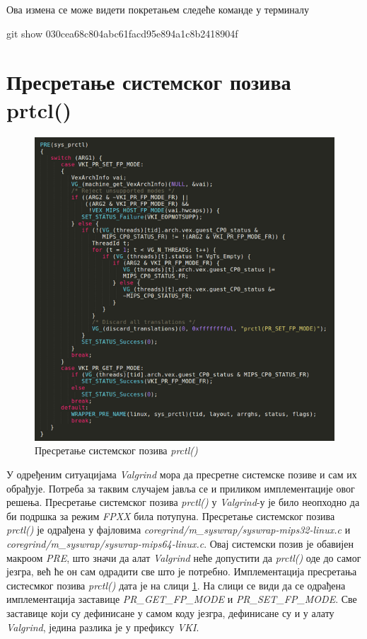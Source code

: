 \documentclass[12pt,oneside]{memoir}
\begin{document}
Ова измена се може видети покретањем следеће команде у терминалу

\begin{center}
git show 030cea68c804abc61facd95e894a1c8b2418904f
\end{center}

\section{Пресретање системског позива prtcl()}

\begin{figure}[h!]
\begin{center}
\includegraphics[scale=0.75]{slika28.png}
\end{center}
\caption{Пресретање системског позива \textit{prctl()}}
\label{fig:prctl}
\end{figure}

\indent У одређеним ситуацијама \textit{Valgrind} мора да пресретне системске позиве и сам их обрађује. Потреба за таквим случајем јавља се и приликом имплементације овог решења. Пресретање системског позива \textit{prctl()} у \textit{Valgrind}-у је било неопходно да би подршка за режим \textit{FPXX} била потупуна. Пресретање системског позива \textit{prctl()} је одрађена у фајловима \textit{coregrind/m\_syswrap/syswrap-mips32-linux.c} и \textit{coregrind/m\_syswrap/syswrap-mips64-linux.c}. Овај системски позив је обавијен макроом \textit{PRE}, што значи да алат \textit{Valgrind} неће допустити да \textit{prctl()} оде до самог језгра, већ ће он сам одрадити све што је потребно. Имплементација пресретања систесмког позива \textit{prctl()} дата је на слици \ref{fig:prctl}. На слици се види да се одрађена имплементација заставице \textit{PR\_GET\_FP\-\_MODE} и \textit{PR\_SET\_FP\-\_MODE}. Све заставице који су дефинисане у самом коду језгра, дефинисане су и у алату \textit{Valgrind}, једина разлика је у префиксу \textit{VKI}.
\end{document}
